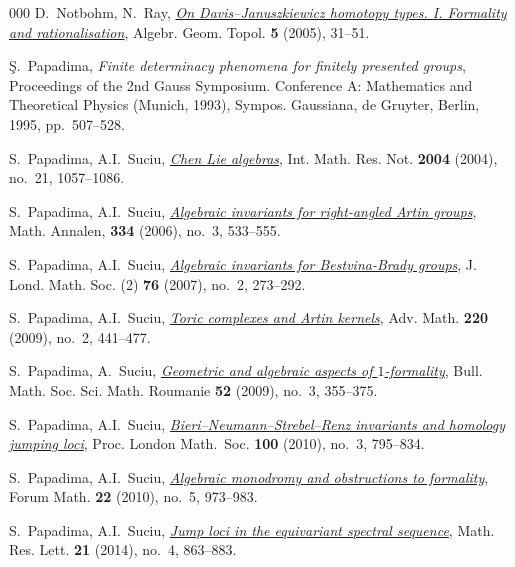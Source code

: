\documentclass{article}
\numberwithin{equation}{section}
\theoremstyle{definition}
\begin{document}
\begin{thebibliography}{000}
 D.~Notbohm, N.~Ray,
\href{https://dx.doi.org/10.2140/agt.2005.5.31}%
{\em On {D}avis--{J}anuszkiewicz homotopy types. \textup{I}. 
Formality and rationalisation},
Algebr. Geom. Topol. \textbf{5} (2005), 31--51. 

 \c{S}.~Papadima, 
\emph{Finite determinacy phenomena for finitely
 presented groups}, Proceedings of the 2nd {G}auss {S}ymposium. {C}onference
{A}: {M}athematics and {T}heoretical {P}hysics ({M}unich, 1993), Sympos.
Gaussiana, de Gruyter, Berlin, 1995, pp.~507--528. 

 S.~Papadima, A.I.~Suciu, 
\href{https://dx.doi.org/10.1155/S1073792804132017}%
{\em Chen {L}ie algebras}, Int. Math. Res. Not. 
\textbf{2004} (2004), no.~21, 1057--1086. 

 S.~Papadima, A.I.~Suciu, 
\href{http://dx.doi.org/10.1007/s00208-005-0704-9}%
{\em Algebraic invariants for right-angled {A}rtin groups}, 
Math. Annalen, \textbf{334} (2006), no.~3, 533--555. 

 S.~Papadima, A.I.~Suciu, 
\href{https://doi.org/10.1112/jlms/jdm045}%
{\em Algebraic invariants for Bestvina-Brady groups}, 
 J. Lond. Math. Soc. (2) \textbf{76} (2007), no.~2, 273--292. 

 S.~Papadima, A.I.~Suciu,
\href{https://dx.doi.org/10.1016/j.aim.2008.09.008}%
{\em Toric complexes and Artin kernels}, 
Adv. Math. \textbf{220} (2009), no.~2, 441--477. 

 S.~Papadima, A.~Suciu,
\href{https://www.jstor.org/stable/43679144}%
{\em Geometric and algebraic aspects of $1$-formality}, 
Bull. Math. Soc. Sci. Math. Roumanie \textbf{52} (2009), 
no.~3, 355--375. 

 S.~Papadima, A.I.~Suciu,
\href{https://dx.doi.org/10.1112/plms/pdp045}%
{\em Bieri--{N}eumann--{S}trebel--{R}enz invariants and 
homology jumping loci}, Proc. London Math.~Soc. 
\textbf{100} (2010), no.~3, 795--834.  

 S.~Papadima, A.I.~Suciu,
\href{https://dx.doi.org/10.1515/FORUM.2010.052}%
{\em Algebraic monodromy and obstructions to formality}, 
Forum Math.  \textbf{22} (2010), no.~5, 973--983. 

 S.~Papadima, A.I.~Suciu,
\href{https://dx.doi.org/10.4310/MRL.2014.v21.n4.a13}%
{\em Jump loci in the equivariant spectral sequence}, 
Math. Res. Lett. \textbf{21} (2014), no.~4, 863--883.


\end{thebibliography}
\end{document}
